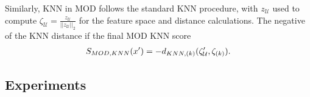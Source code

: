 Similarly, KNN in MOD follows the standard KNN procedure, with $z_{\mathcal{U}}$ used to compute $\zeta_{\mathcal{U}} = \frac{z_{\mathcal{U}}}{\lvert \rvert z_{\mathcal{U}} \lvert \rvert_{2}}$ for the feature space and distance calculations. The negative of the KNN distance if the final MOD KNN score
\begin{equation}
\begin{aligned}
    S_{MOD,KNN}(x') =  -d_{KNN,(k)}(\zeta'_{\mathcal{U}}, \zeta_{(k)}). \\
\end{aligned}
\end{equation}


\subsection{Experiments}
\label{sec:propwork-mod-exp}

